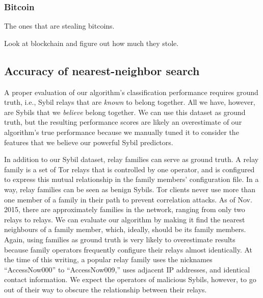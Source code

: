\subsubsection{Bitcoin}
The ones that are stealing bitcoins.

Look at blockchain and figure out how much they stole.


\subsection{Accuracy of nearest-neighbor search}
\label{sec:accuracy}
A proper evaluation of our algorithm's classification performance requires
ground truth, i.e., Sybil relays that are \emph{known} to belong together.  All
we have, however, are Sybils that we \emph{believe} belong together.  We can use
this dataset as ground truth, but the resulting performance scores are likely an
overestimate of our algorithm's true performance because we manually tuned it to
consider the features that we believe our powerful Sybil predictors.

In addition to our Sybil dataset, relay families can serve as ground truth.  A
relay family is a set of Tor relays that is controlled by one operator, and is
configured to express this mutual relationship in the family members'
configuration file.  In a way, relay families can be seen as benign Sybils.  Tor
clients never use more than one member of a family in their path to prevent
correlation attacks.  As of Nov.  2015, there are approximately 
families in the network, ranging from only two relays to  relays.
We can evaluate our algorithm by making it find the nearest neighbours of a
family member, which, ideally, should be its family members.  Again, using
families as ground truth is very likely to overestimate results because family
operators frequently configure their relays almost identically.  At the time of
this writing, a popular relay family uses the nicknames ``AccessNow000'' to
``AccessNow009,'' uses adjacent IP addresses, and identical contact information.
We expect the operators of malicious Sybils, however, to go out of their way to
obscure the relationship between their relays.

